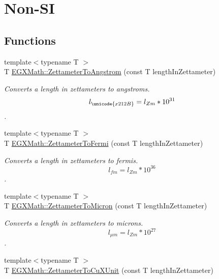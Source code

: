 \hypertarget{group___e_g_x_math-_conversions-_length_conversions-_zettameter-_non-_s_i}{}\section{Non-\/\+SI}
\label{group___e_g_x_math-_conversions-_length_conversions-_zettameter-_non-_s_i}
\subsection*{Functions}
\begin{DoxyCompactItemize}
\item 
{\footnotesize template$<$typename T $>$ }\\T \mbox{\hyperlink{group___e_g_x_math-_conversions-_length_conversions-_zettameter-_non-_s_i_ga49d813ff9592fc1fc9a184436d0849fc}{E\+G\+X\+Math\+::\+Zettameter\+To\+Angstrom}} (const T length\+In\+Zettameter)
\begin{DoxyCompactList}\small\item\em Converts a length in zettameters to angstroms. \[ l_{\unicode{x212B}}=l_{Zm} * 10^{31} \]. \end{DoxyCompactList}\item 
{\footnotesize template$<$typename T $>$ }\\T \mbox{\hyperlink{group___e_g_x_math-_conversions-_length_conversions-_zettameter-_non-_s_i_ga791b0a401fe813fe4e6a34490f12a817}{E\+G\+X\+Math\+::\+Zettameter\+To\+Fermi}} (const T length\+In\+Zettameter)
\begin{DoxyCompactList}\small\item\em Converts a length in zettameters to fermis. \[ l_{fm}=l_{Zm} * 10^{36} \]. \end{DoxyCompactList}\item 
{\footnotesize template$<$typename T $>$ }\\T \mbox{\hyperlink{group___e_g_x_math-_conversions-_length_conversions-_zettameter-_non-_s_i_gafede369c63111d97f92238e626cdfa87}{E\+G\+X\+Math\+::\+Zettameter\+To\+Micron}} (const T length\+In\+Zettameter)
\begin{DoxyCompactList}\small\item\em Converts a length in zettameters to microns. \[ l_{\mu m}=l_{Zm} * 10^{27} \]. \end{DoxyCompactList}\item 
{\footnotesize template$<$typename T $>$ }\\T \mbox{\hyperlink{group___e_g_x_math-_conversions-_length_conversions-_zettameter-_non-_s_i_ga91f2890d91086a45ad9d2b5e7e82b60a}{E\+G\+X\+Math\+::\+Zettameter\+To\+Cu\+X\+Unit}} (const T length\+In\+Zettameter)

\end{DoxyCompactItemize}
